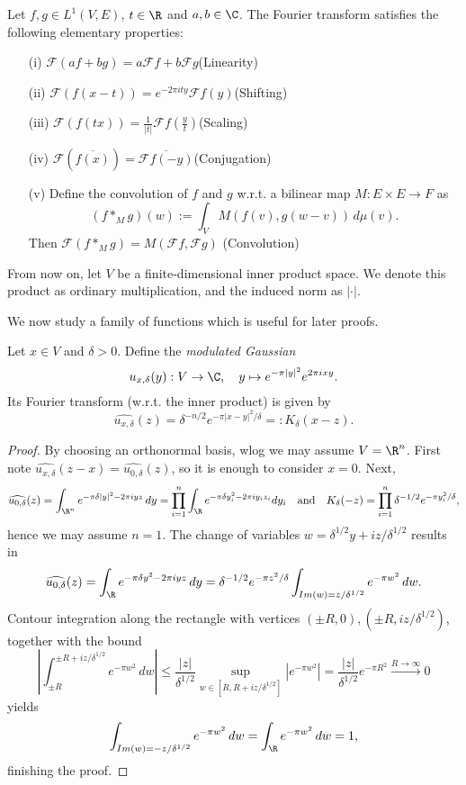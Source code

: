 \begin{lemma}
  \label{lem:fourier-prop}
  \lean{}
Let $f,g\in L^1(V,E)$, $t\in\R$ and $a,b\in\C$. The Fourier transform satisfies the following elementary properties:
\begin{enumerate}
  \item[(i)] $\mathcal F(af+bg)=a\mathcal Ff+b\mathcal Fg$\hfill(Linearity)
  \item[(ii)] $\mathcal F(f(x-t)) = e^{-2\pi i ty}\mathcal F f(y)$\hfill (Shifting)
  \item[(iii)] $\mathcal F(f(tx)) = \frac1{|t|}\mathcal F f(\frac yt)$\hfill (Scaling)
  \item[(iv)] $\mathcal F(\overline{f(x)}) = \overline{\mathcal Ff(-y)}$\hfill (Conjugation)
  \item[(v)] Define the convolution of $f$ and $g$ w.r.t. a bilinear map $M:E\times E\to F$ as
             $$(f\ast_Mg)(w):=\int_VM(f(v),g(w-v))\,d\mu(v).$$ Then
             $\mathcal F(f\ast_M g) =M(\mathcal Ff,\mathcal Fg)$ \hfill (Convolution)
\end{enumerate}
\end{lemma}
From now on, let $V$ be a finite-dimensional inner product space.
We denote this product as ordinary multiplication, and the induced norm as $|\cdot|.$

We now study a family of functions which is useful for later proofs.
\begin{lemma}
\label{lem:fourier-gaussian}
\leanok
Let $x\in V$ and $\delta>0$. Define the \emph{modulated Gaussian}
$$u_{x,\delta}(y):V\to\C,\quad y\mapsto e^{-\pi|y|^2}e^{2\pi i x y}.$$
Its Fourier transform (w.r.t. the inner product) is given by
$$\widehat{u_{x,\delta}}(z)=\delta^{-n/2}e^{-\pi|x-y|^2/\delta}=:K_\delta(x-z).$$
\end{lemma}
\begin{proof}
  \leanok
  By choosing an orthonormal basis, wlog we may assume $V=\R^n$.
  First note $\widehat{u_{x,\delta}}(z-x)=\widehat{u_{0,\delta}}(z)$, so it is enough to consider $x=0$.
  Next, $$\widehat{u_{0,\delta}}(z)=\int_{\R^n}e^{-\pi\delta|y|^2-2\pi iyz}\,dy=
  \prod_{i=1}^n\int_{\R}e^{-\pi\delta y_i^2-2\pi iy_iz_i}dy_i\quad\text{and}\quad
  K_\delta(-z)=\prod_{i=1}^n\delta^{-1/2}e^{-\pi y_i^2/\delta},$$ hence we may assume $n=1$.
  The change of variables $w=\delta^{1/2}y+iz/\delta^{1/2}$ results in
  $$\widehat{u_{0,\delta}}(z)=\int_{\R} e^{-\pi\delta y^2-2\pi i y z}\,dy=
  \delta^{-1/2}e^{-\pi z^2/\delta}\int_{Im(w)=z/\delta^{1/2}}e^{-\pi w^2}\,dw.$$
  Contour integration along the rectangle with vertices $(\pm R,0),(\pm R,iz/\delta^{1/2})$, together
  with the bound $$\left|\int_{\pm R}^{\pm R+iz/\delta^{1/2}}e^{-\pi w^2}\,dw\right|\leq
  \frac{|z|}{\delta^{1/2}}\sup_{w\in[R,R+iz/\delta^{1/2}]}|e^{-\pi w^2}|=
  \frac{|z|}{\delta^{1/2}}e^{-\pi R^2}\xrightarrow{R\to\infty}0$$
  yields
  $$\int_{Im(w)=-z/\delta^{1/2}}e^{-\pi w^2}\,dw=
  \int_{\R} e^{-\pi w^2}\,dw=1,$$ finishing the proof.
\end{proof}

